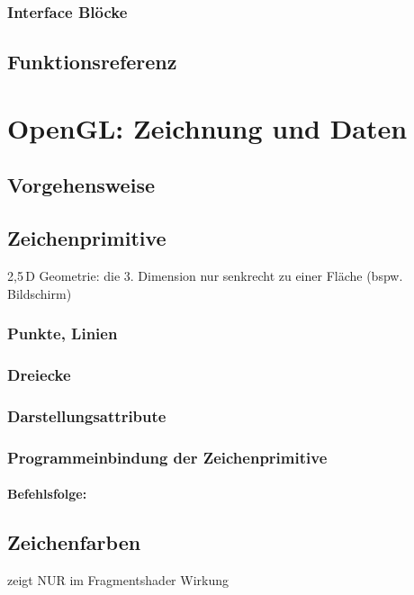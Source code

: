 \subsection{Interface Blöcke}

\section{Funktionsreferenz}

\chapter{OpenGL: Zeichnung und Daten}

\section{Vorgehensweise}

\section{Zeichenprimitive}

2,5\,D Geometrie: die 3. Dimension nur senkrecht zu einer Fläche (bspw. Bildschirm)

\subsection{Punkte, Linien}

\subsection{Dreiecke}

\subsection{Darstellungsattribute}

\subsection{Programmeinbindung der Zeichenprimitive}
\subsubsection*{Befehlsfolge:}

\section{Zeichenfarben}
zeigt NUR im Fragmentshader Wirkung
